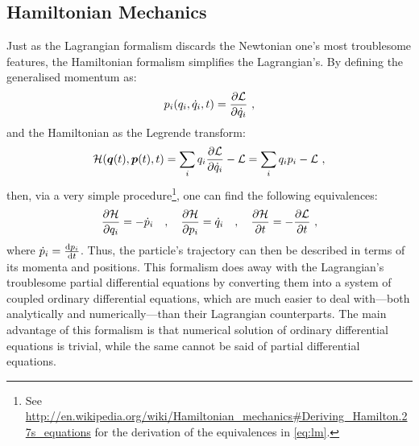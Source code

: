 \subsection{Hamiltonian Mechanics}\label{sb:hm}
%
Just as the Lagrangian formalism discards the Newtonian one's most troublesome features, the Hamiltonian formalism simplifies the Lagrangian's. By defining the generalised momentum as:
\begin{align}\label{eq:genmom}
p_{i}(q_{i}, \dot{q}_{i}, t) = \frac{\partial \mathcal{L}}{\partial \dot{q}_{i}}~,
\end{align}
and the Hamiltonian as the Legrende transform:
\begin{align}\label{eq:hamiltonian}
\mathcal{H}(\bm{q}(t), \bm{p}(t), t) = \sum\limits_{i}q_{i}\frac{\partial \mathcal{L}}{\partial \dot{q}_{i}} - \mathcal{L} = \sum\limits_{i}q_{i}p_{i} - \mathcal{L}~,
\end{align}
then, via a very simple procedure\footnote{See \url{http://en.wikipedia.org/wiki/Hamiltonian\_mechanics\#Deriving\_Hamilton.27s\_equations} for the derivation of the equivalences in \cref{eq:lm}.}, one can find the following equivalences:
\begin{align}\label{eq:lm}
\frac{\partial \mathcal{H}}{\partial q_{i}} = -\dot{p}_{i} \quad,\quad \frac{\partial \mathcal{H}}{\partial p_{i}} = \dot{q}_{i}\quad, \quad \frac{\partial \mathcal{H}}{\partial t} = -\frac{\partial \mathcal{L}}{\partial t}~,
\end{align}
where $ \dot{p}_{i} = \frac{\textrm{d} p_{i}}{\textrm{d} t} $. Thus, the particle's trajectory can then be described in terms of its momenta and positions. This formalism does away with the Lagrangian's troublesome partial differential equations by converting them into a system of coupled ordinary differential equations, which are much easier to deal with---both analytically and numerically---than their Lagrangian counterparts. The main advantage of this formalism is that numerical solution of ordinary differential equations is trivial, while the same cannot be said of partial differential equations.
%
